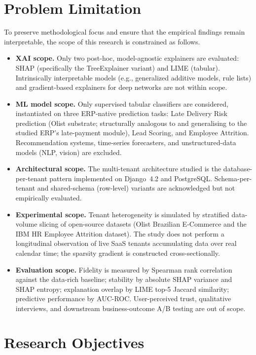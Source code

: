 \section{Problem Limitation}
\label{sec:problem-limitation}

To preserve methodological focus and ensure that the empirical findings remain interpretable, the scope of this research is constrained as follows.

\begin{itemize}
    \item \textbf{XAI scope.} Only two post-hoc, model-agnostic explainers are evaluated: SHAP (specifically the TreeExplainer variant) and LIME (tabular). Intrinsically interpretable models (e.g., generalized additive models, rule lists) and gradient-based explainers for deep networks are not within scope.
    \item \textbf{ML model scope.} Only supervised tabular classifiers are considered, instantiated on three ERP-native prediction tasks: Late Delivery Risk prediction (Olist substrate; structurally analogous to and generalising to the studied ERP's late-payment module), Lead Scoring, and Employee Attrition. Recommendation systems, time-series forecasters, and unstructured-data models (NLP, vision) are excluded.
    \item \textbf{Architectural scope.} The multi-tenant architecture studied is the database-per-tenant pattern implemented on Django~4.2 and PostgreSQL. Schema-per-tenant and shared-schema (row-level) variants are acknowledged but not empirically evaluated.
    \item \textbf{Experimental scope.} Tenant heterogeneity is simulated by stratified data-volume slicing of open-source datasets (Olist Brazilian E-Commerce and the IBM HR Employee Attrition dataset). The study does not perform a longitudinal observation of live SaaS tenants accumulating data over real calendar time; the sparsity gradient is constructed cross-sectionally.
    \item \textbf{Evaluation scope.} Fidelity is measured by Spearman rank correlation against the data-rich baseline; stability by absolute SHAP variance and SHAP entropy; explanation overlap by LIME top-5 Jaccard similarity; predictive performance by AUC-ROC. User-perceived trust, qualitative interviews, and downstream business-outcome A/B testing are out of scope.
\end{itemize}

\section{Research Objectives}
\label{sec:research-objectives}

